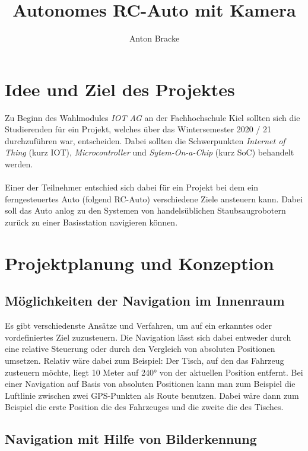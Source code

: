 \documentclass{article}
\title{Autonomes RC-Auto mit Kamera}
\author{Anton Bracke}
\begin{document}
\graphicspath{ {./images/} }
\maketitle
\newpage
\tableofcontents
\newpage

\section{Idee und Ziel des Projektes}

Zu Beginn des Wahlmodules \textit{IOT AG} an der Fachhochschule Kiel sollten sich die Studierenden für ein Projekt,
welches über das Wintersemester 2020 / 21 durchzuführen war, entscheiden. Dabei sollten die Schwerpunkten
\textit{Internet of Thing} (kurz IOT), \textit{Microcontroller} und \textit{Sytem-On-a-Chip} (kurz SoC) behandelt werden.
\\~\\
Einer der Teilnehmer entschied sich dabei für ein Projekt bei dem ein ferngesteuertes Auto (folgend RC-Auto) verschiedene Ziele
ansteuern kann. Dabei soll das Auto anlog zu den Systemen von handelsüblichen Staubsaugrobotern zurück zu einer Basisstation
navigieren können.

\section{Projektplanung und Konzeption}

\subsection{Möglichkeiten der Navigation im Innenraum}

Es gibt verschiedenste Ansätze und Verfahren, um auf ein erkanntes oder vordefiniertes Ziel zuzusteuern.
Die Navigation lässt sich dabei entweder durch eine relative Steuerung oder durch den Vergleich von absoluten Positionen umsetzen.
Relativ wäre dabei zum Beispiel: Der Tisch, auf den das Fahrzeug zusteuern möchte, liegt 10 Meter auf 240° von der aktuellen
Position entfernt.
Bei einer Navigation auf Basis von absoluten Positionen kann man zum Beispiel die Luftlinie zwischen zwei GPS-Punkten als Route benutzen.
Dabei wäre dann zum Beispiel die erste Position die des Fahrzeuges und die zweite die des Tisches.

\subsection{Navigation mit Hilfe von Bilderkennung}
\end{document}
